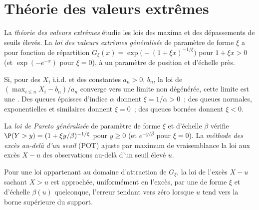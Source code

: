 \section{Théorie des valeurs extrêmes}

\begin{definition}\label{def:qm:robust-statistics-and-heavy-tails:gev}
La \emph{théorie des valeurs extrêmes} étudie les lois des maxima et des dépassements de seuils élevés. La
\emph{loi des valeurs extrêmes généralisée} de paramètre de forme $\xi$ a pour fonction de répartition
$G_\xi(x) = \exp\bigl(-(1 + \xi x)^{-1/\xi}\bigr)$ pour $1 + \xi x > 0$ (et $\exp(-e^{-x})$ pour $\xi = 0$), à un paramètre de position et d'échelle près.
\end{definition}

\begin{theorem}\label{thm:qm:robust-statistics-and-heavy-tails:ftg}
Si, pour des $X_i$ i.i.d. et des constantes $a_n > 0$, $b_n$, la loi de $(\max_{i \le n}X_i - b_n)/a_n$ converge vers une limite non dégénérée, cette limite est une
. Des queues épaisses d'indice $\alpha$ donnent $\xi = 1/\alpha > 0$~; des queues normales, exponentielles et similaires
donnent $\xi = 0$~; des queues bornées donnent $\xi < 0$.
\end{theorem}

\begin{definition}\label{def:qm:robust-statistics-and-heavy-tails:gpd}
La \emph{loi de Pareto généralisée} de paramètre de forme $\xi$ et d'échelle $\beta$ vérifie $\P(Y > y) = (1 +
\xi y/\beta)^{-1/\xi}$ pour $y \ge 0$ (et $e^{-y/\beta}$ pour $\xi = 0$). La \emph{méthode des excès au-delà d'un seuil} (POT) ajuste
par maximum de vraisemblance la loi aux excès $X - u$ des observations au-delà d'un seuil élevé $u$.
\end{definition}

\begin{theorem}\label{thm:qm:robust-statistics-and-heavy-tails:pbdh}
Pour une loi appartenant au domaine d'attraction de $G_\xi$, la loi de l'excès $X - u$ sachant $X > u$ est approchée, uniformément en
l'excès, par une  de forme $\xi$ et d'échelle $\beta(u)$ quelconque, l'erreur tendant vers zéro lorsque $u$ tend vers la borne
supérieure du support.
\end{theorem}

